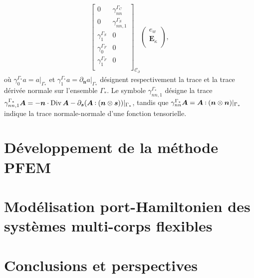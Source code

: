 \begin{equation}
\begin{aligned}
{\begin{bmatrix}
	{0} & \gamma_{nn}^{\Gamma_C} \\
	{0} & \gamma_{nn, 1}^{\Gamma_S} \\
	\gamma_{1}^{\Gamma_S} & {0} \\
	\gamma_{0}^{\Gamma_F} & {0} \\
	\gamma_{1}^{\Gamma_F} & {0} \\
	\end{bmatrix}}_{\mathcal{C}_\partial}
\begin{pmatrix}
e_w \\
\bm{E}_{\kappa} \\
\end{pmatrix},
\end{aligned}
\end{equation}
où $ \gamma_{0}^{\Gamma_*} a = a \vert_{\Gamma_*} $ et $ \gamma_{1}^{\Gamma_*} a = \partial_{\bm{n}} a \vert_{\Gamma_*} $ désignent respectivement la trace et la trace dérivée normale sur l'ensemble $\Gamma_*$. Le symbole $\gamma_{nn, 1}^{\Gamma_*}$ désigne la trace $\gamma_{nn, 1}^{\Gamma_*} \bm{A} = -\bm{n} \cdot \Div \bm{A} - \partial_{\bm{s}} (\bm{A} \cddot (\bm{n} \otimes \bm{s})) \vert_{\Gamma_*}$, tandis que $\gamma_{nn}^{\Gamma_*} \bm{A} = \bm{A} \cddot (\bm{n} \otimes \bm{n}) \vert_{\Gamma_*} $ indique la  trace normale-normale d'une fonction tensorielle. 

\section{Développement de la méthode PFEM}

\section{Mod\'elisation port-Hamiltonien des systèmes multi-corps flexibles}



\newpage
\section{Conclusions et perspectives}
